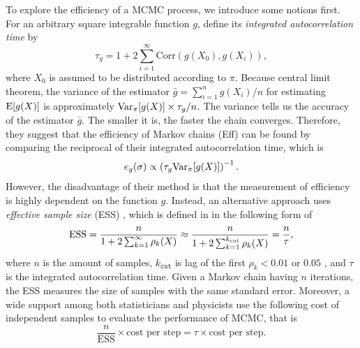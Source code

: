 To explore the efficiency of a MCMC process, we introduce some notions first. For an arbitrary square integrable function $g$, \cite{roberts2001optimal} define its \textit{integrated autocorrelation time} by 
\begin{equation}
\tau_g = 1+ 2\sum_{i=1}^{\infty} \mathrm{Corr}\left( g(X_0),g(X_i) \right),
\end{equation}
where $X_0$ is assumed to be distributed according to $\pi$. Because central limit theorem, the variance of the estimator $\bar{g} = \sum_{i=1}^{n}g(X_i)/n$ for estimating $\mathrm{E}\lbrack g(X) \rbrack$ is approximately $\mathrm{Var}_\pi\lbrack g(X)\rbrack \times \tau_g/n$. The variance tells us the accuracy of the estimator $\bar{g}$. The smaller it is, the faster the chain converges. Therefore, they suggest that the efficiency of Markov chains (Eff) can be found by comparing the reciprocal of their integrated autocorrelation time, which is 
\begin{equation}
e_g(\sigma)\propto \left(\tau_g\mathrm{Var}_\pi\lbrack g(X)\rbrack \right)^{-1}. 
\end{equation}
However, the disadvantage of their method is that the measurement of efficiency is highly dependent on the function $g$. Instead, an alternative approach uses \textit{effective sample size} (ESS) \citep{kass1998markov, robert2004monte},  which is defined in \citep{gong2016practical} in the following form of  
\begin{equation}
\mbox{ESS} =  \frac{n}{1+2\sum_{k=1}^{\infty}\rho_k(X)} \approx \frac{n}{1+2\sum_{k=1}^{k_\text{\tiny cut}}\rho_k(X)}= \frac{n}{\tau}, 
\end{equation}
where $n$ is the amount of samples, $k_\mathtt{cut}$ is lag of the first $\rho_k<0.01$  or $0.05$ , and $\tau$ is the integrated autocorrelation time. Given a Markov chain having $n$ iterations, the ESS measures the size of \iid samples with the same standard error. Moreover, a wide support among both statisticians \citep{geyer1992practical} and physicists \citep{sokal1997monte} use the following cost of independent samples to evaluate the performance of MCMC, that is 
\begin{equation}
\frac{n}{\mbox{ESS}}\times \mbox{cost per step} = \tau \times  \mbox{cost per step}.
\end{equation} 

